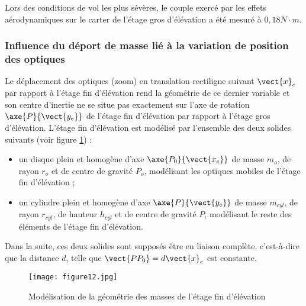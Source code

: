Lors des conditions de vol les plus sévères, le couple exercé par les effets aérodynamiques sur le carter de l'étage
gros d'élévation a été mesuré à $0,18 N\cdot m$.


\subsubsection{Influence du déport de masse lié à la variation de position des optiques}

Le déplacement des optiques (zoom) en translation rectiligne suivant $\vect{x}_e$ par rapport à l'étage fin d'élévation
rend la géométrie de ce dernier variable et son centre d'inertie ne se situe pas exactement sur l'axe de rotation
$\axe{P}{\vect{y_e}}$ de l'étage fin d'élévation par rapport à l'étage gros d'élévation.
L'étage fin d'élévation est modélisé par l'ensemble des deux solides suivants (voir figure \ref{figure12}) :
\begin{itemize}
\item un disque plein et homogène d'axe $\axe{P_0}{\vect{x_e}}$ de masse $m_o$, de rayon $r_o$ et de centre de gravité $P_o$, modélisant les optiques mobiles de l'étage fin d'élévation ;
\item un cylindre plein et homogène d'axe $\axe{P}{\vect{y_e}}$ de masse $m_{cyl}$, de rayon $r_{cyl}$, de hauteur $h_{cyl}$ et de centre de gravité $P$, modélisant le reste des éléments de l'étage fin d'élévation.
\end{itemize}

Dans la suite, ces deux solides sont supposés être en liaison complète, c'est-à-dire que la distance $d$, telle que $\vect{PP_0}=d\vect{x}_e$ est constante.

\begin{figure}[!htb]
\begin{center}
\texttt{[image: figure12.jpg]}
\caption{Modélisation de la géométrie des masses de l'étage fin d'élévation \label{figure12}}
\end{center}
\end{figure}

